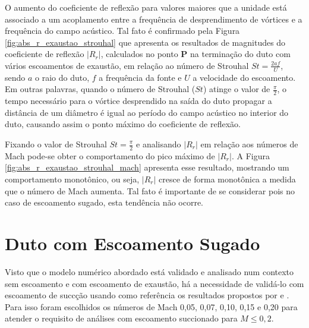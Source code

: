 O aumento do coeficiente de reflexão para valores maiores que a unidade está associado a um acoplamento entre a frequência de desprendimento de vórtices e a frequência do campo acústico. Tal fato é confirmado pela Figura \ref{fig:abs_r_exaustao_strouhal} que apresenta os resultados de magnitudes do coeficiente de reflexão $|R_{r}|$, calculados no ponto $\textbf{P}$ na terminação do duto com vários escoamentos de exaustão, em relação ao número de Strouhal $St = \frac{2af}{U}$, sendo $a$ o raio do duto, $f$ a frequência da fonte e $U$ a velocidade do escoamento. Em outras palavras, quando o número de Strouhal ($St$) atinge o valor de $\frac{\pi}{2}$, o tempo necessário para o vórtice desprendido na saída do duto propagar a distância de um diâmetro é igual ao período do campo acústico no interior do duto, causando assim o ponto máximo do coeficiente de reflexão.

Fixando o valor de Strouhal $St = \frac{\pi}{2}$ e analisando $|R_{r}|$ em relação aos números de Mach pode-se obter o comportamento do pico máximo de $|R_{r}|$. A Figura \ref{fig:abs_r_exaustao_strouhal_mach} apresenta esse resultado, mostrando um comportamento monotônico, ou seja, $|R_{r}|$ cresce de forma monotônica a medida que o número de Mach aumenta. Tal fato é importante de se considerar pois no caso de escoamento sugado, esta tendência não ocorre.  

\begin{figure}[ht!]
\centering
  
\end{figure}

\begin{figure}[ht!]
\centering
  
\end{figure}

\newpage
\section{Duto com Escoamento Sugado}

Visto que o modelo numérico abordado está validado e analisado num contexto sem escoamento e com escoamento de exaustão, há a necessidade de validá-lo com escoamento de succção usando como referência os resultados propostos por  e . Para isso foram escolhidos os números de Mach 0,05, 0,07, 0,10, 0,15 e 0,20 para atender o requisito de  análises com escoamento succionado para $M \leq 0,2$.

